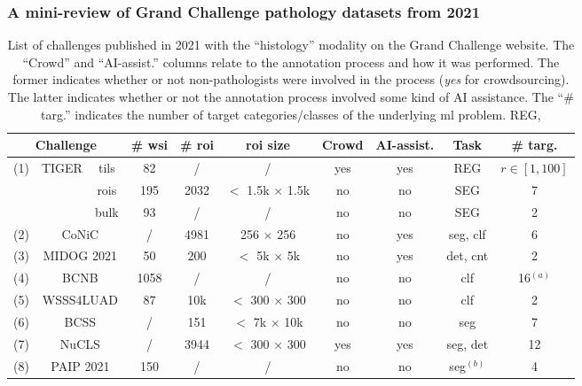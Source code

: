 \subsubsection{A mini-review of Grand Challenge pathology datasets from 2021}
\label{sssec:backdp:grandchallenge}

\begin{table}
  \centering
  \footnotesize
  \begin{tabular}{|ccc|ccccccc|}
    \hline
    \multicolumn{3}{|c|}{Challenge} & \# \acrshort{wsi} & \# \acrshort{roi} & \acrshort{roi} size & Crowd & AI-assist. & Task & \# targ. \\
    \hline
    \multirow{3}{*}{(1)} & \multirow{3}{*}{TIGER} & tils & 82 & / &  / & yes & yes & REG & $r \in \left[1, 100\right]$\\
    & & rois & 195 & 2032 & $<$ 1.5k $\times$ 1.5k & no & no & SEG & 7\\
    & & bulk & 93 & / & / & no & no & SEG & 2 \\
    \hdashline
    (2) & \multicolumn{2}{c|}{CoNiC} & / & 4981 & 256 $\times$ 256 & no & yes & \acrshort{seg}, \acrshort{clf} & 6 \\
    (3) & \multicolumn{2}{c|}{MIDOG 2021} & 50 & 200 & $<$ 5k $\times$ 5k & no & yes & \acrshort{det}, \acrshort{cnt} & 2 \\
    (4) & \multicolumn{2}{c|}{BCNB} & 1058 & / & / & no & no & \acrshort{clf} & 16$^{(a)}$ \\
    (5) & \multicolumn{2}{c|}{WSSS4LUAD} & 87 & 10k & $<$ 300 $\times$ 300 & no & no & \acrshort{clf} & 2\\
    (6) & \multicolumn{2}{c|}{BCSS} & / & 151 & $<$ 7k $\times$ 10k & no & no & \acrshort{seg} & 7\\
    (7) & \multicolumn{2}{c|}{NuCLS} & / & 3944 & $<$ 300 $\times$ 300 & yes & yes & \acrshort{seg}, \acrshort{det} & 12 \\
    (8) & \multicolumn{2}{c|}{PAIP 2021} & 150 & / & / & no & no & \acrshort{seg}$^{(b)}$ & 4 \\
    \hline
  \end{tabular}
  \caption{List of challenges published in 2021 with the ``histology'' modality on the Grand Challenge website. The ``Crowd'' and 
  ``AI-assist.'' columns relate to the annotation process and how it was performed. The former indicates whether or not non-pathologists 
  were involved in the process (\ie \textit{yes} for crowdsourcing). The latter indicates whether or not the annotation process involved 
  some kind of AI assistance. The ``\# targ.'' indicates the number of target categories/classes of the underlying \acrlong{ml} problem. REG, 
}
\end{table}
